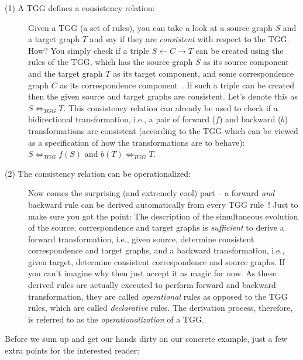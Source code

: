 \begin{description}

\item[(1) A TGG defines a consistency relation:]
	Given a TGG (a set of rules), you can take a look at a source graph $S$ and a target graph $T$ and say if they are \emph{consistent} with
	respect to the TGG. How?  You simply check if a triple $S\leftarrow C\rightarrow T$ can be created using the rules of the TGG, which has the source graph $S$
	as its source component and the target graph $T$ as its target component, and some correspondence graph $C$ as its correspondence
	component~\cite{Hermann2011a}. If such a triple can be created then the given source and target graphs are consistent. Let's denote this as $S
	\Leftrightarrow_{TGG} T$. This consistency relation can already be used to check if a bidirectional transformation, i.e., a pair of forward ($f$) and backward
	($b$) transformations are consistent (according to the TGG which can be viewed as a specification of how the transformations are to behave):  $S
	\Leftrightarrow_{TGG} f(S)$ and $b(T) \Leftrightarrow_{TGG} T$.
	
\item[(2) The consistency relation can be operationalized:]
	Now comes the surprising (and extremely cool) part -- a forward \emph{and} backward rule can be derived automatically from every TGG
	rule~\cite{Giese2010,Hermann2011a}! Just to make sure you got the point:  The description of the simultaneous evolution of the source, correspondence and
	target graphs is \emph{sufficient} to derive a forward transformation, i.e., given source, determine consistent correspondence and target graphs, and a
	backward transformation, i.e., given target, determine consistent correspondence and source graphs. If you can't imagine why then just accept it as magic for
	now. As these derived rules are actually executed to perform forward and backward transformation, they are called \emph{operational} rules as opposed to the
	TGG rules, which are called \emph{declarative} rules. The derivation process, therefore, is referred to as the \emph{operationalization} of a TGG.
	
\end{description}

Before we sum up and get our hands dirty on our concrete example, just a few extra points for the interested reader:  

